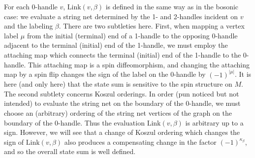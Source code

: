 For each 0-handle $v$, $\text{Link}(v,\beta)$ is defined in the same way as in the bosonic case:
we evaluate a string net determined by the 1- and 2-handles incident on $v$ and the labeling $\beta$.
There are two subtleties here.
First, when mapping a vertex label $\mu$ from the initial (terminal) end of a 1-handle to the opposing 0-handle adjacent to the terminal (initial) end of the 1-handle, 
we must employ the attaching map which connects the terminal (initial) end of the 1-handle to the 0-handle.
This attaching map is a spin diffeomorphism, 
and changing the attaching map by a spin flip changes the sign
of the label on the 0-handle by $(-1)^{|\mu|}$.
It is here (and only here) that the state sum is sensitive to the spin structure on $M$.
The second subtlety concerns Koszul orderings.
In order (pun noticed but not intended)
to evaluate the string net on the boundary of the 0-handle, we must choose an (arbitrary) ordering
of the string net vertices of the graph on the boundary of the 0-handle.
Thus the evaluation $\text{Link}(v, \beta)$ is arbitrary up to a sign.
However, we will see that a change of Koszul ordering which changes the sign of $\text{Link}(v, \beta)$ also produces a compensating
change in the factor $(-1)^{\kappa_\beta}$, and so the overall state sum is well defined.

